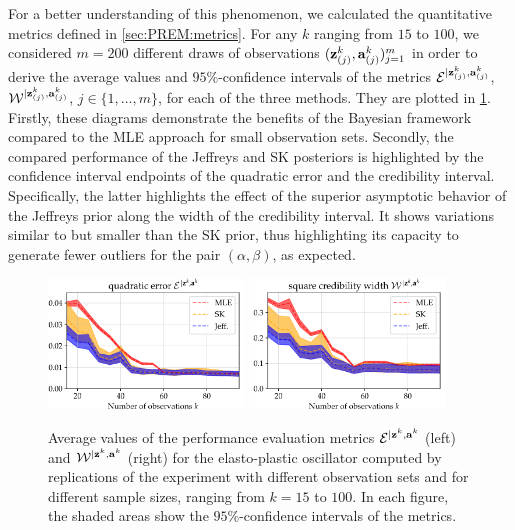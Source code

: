For a better understanding of this phenomenon, we calculated the quantitative metrics defined in \cref{sec:PREM:metrics}. For any $k$ ranging from $15$ to $100$, we considered $m=200$ different draws of observations $(\mathbf{z}^k_{(j)},\mathbf{a}^{k}_{(j)})_{j=1}^m$ in order to derive the average values and $95\%$-confidence intervals of the metrics $\mathcal{E}^{|\mathbf{z}^k_{(j)},\mathbf{a}^k_{(j)}}$, $\mathcal{W}^{|\mathbf{z}^k_{(j)},\mathbf{a}^k_{(j)}}$, $j\in\{1,\dots,m\}$, for each of the three methods. %
They are plotted in \cref{fig:errors}. Firstly, these diagrams demonstrate the benefits of the Bayesian framework compared to the MLE approach for small observation sets. Secondly, the compared performance of the Jeffreys and SK posteriors is highlighted by the confidence interval endpoints of the quadratic error and the credibility interval. Specifically, the latter highlights the effect of the superior asymptotic behavior of the Jeffreys prior along the width of the credibility interval. It shows variations similar to but smaller than the SK prior, thus highlighting its capacity to generate fewer outliers for the pair $(\alpha, \beta)$, as expected.

\begin{figure}[h]
    \centering%
    \includegraphics[width=5.2cm]{figures/PREM/oscill/errE.pdf}\hspace*{0.5cm}
    \includegraphics[width=5.2cm]{figures/PREM/oscill/errW.pdf}
    \caption{%
    Average values of the performance evaluation metrics $\mathcal{E}^{|\mathbf{z}^k,\mathbf{a}^k}$ (left) and $\mathcal{W}^{|\mathbf{z}^k,\mathbf{a}^k}$ (right) for the elasto-plastic oscillator computed by replications of the experiment with different observation sets and for different sample sizes, ranging from $k=15$ to $100$. In each figure, the shaded areas show the $95\%$-confidence intervals of the metrics.}
    \label{fig:errors}
\end{figure}





